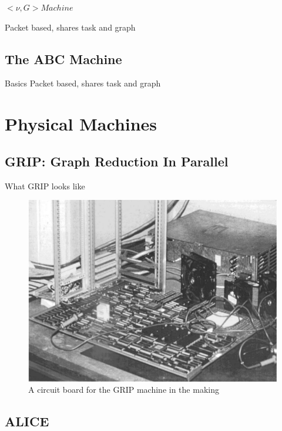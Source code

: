 \documentclass{beamer}
\begin{document}
\begin{frame}{$<\nu, G> Machine$}

Packet based, shares task and graph
\end{frame}


\subsection[The ABC Machines]{The ABC Machine}
\begin{frame}{Basics}
Packet based, shares task and graph
\end{frame}

\section{Physical Machines}

\subsection[GRIP]{GRIP: Graph Reduction In Parallel}
\begin{frame}[fragile]{What GRIP looks like}{}

\begin{figure}[h]
 \centering
 \includegraphics[scale=.4]{figures/GRIP.png}
 \caption{A circuit board for the GRIP machine in the making \citep{PFPAnIntro}}
\end{figure}
\end{frame}

\subsection[ALICE]{ALICE}
\end{document}
